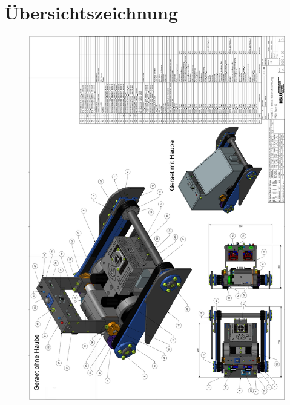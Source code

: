 \section{Übersichtszeichnung}

\begin{figure}[H]
  \includegraphics[width=1\textwidth]{img/Gerät Aufbau/Übersichtszeichnung.PNG}
  \centering
\end{figure}